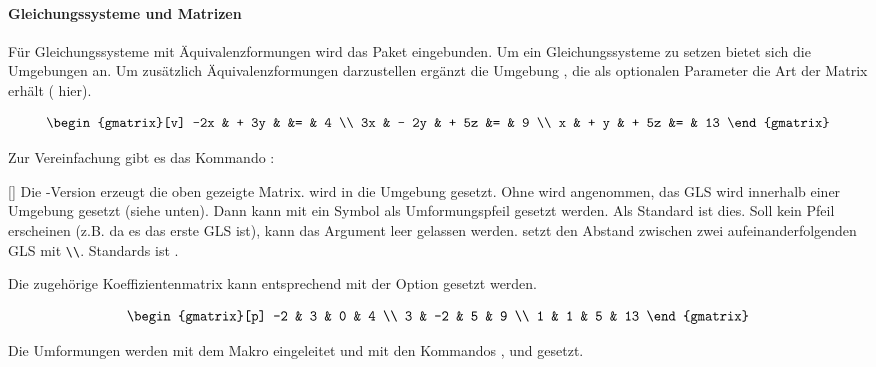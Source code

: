 \paragraph{Gleichungssysteme und Matrizen}

Für Gleichungssysteme mit Äquivalenzformungen wird das Paket  eingebunden. Um ein Gleichungssysteme zu setzen bietet sich die  Umgebungen  an. Um zusätzlich Äquivalenzformungen darzustellen ergänzt  die Umgebung , die als optionalen Parameter die Art der  Matrix erhält ( hier).
\begin{sidebyside}
	\[ \begin{gmatrix}[v]
	-2x & + 3y &      &= &  4 \\
	 3x & - 2y & + 5z &= &  9 \\
	  x & +  y & + 5z &= & 13
	\end{gmatrix} \]
\end{sidebyside}

Zur Vereinfachung gibt es das Kommando :
\begin{commands}
	[\sarg{}]
	Die \sarg-Version erzeugt die oben gezeigte Matrix.  wird in die  Umgebung gesetzt. Ohne \sarg wird angenommen, das GLS wird innerhalb einer \sarg Umgebung gesetzt (siehe unten). Dann kann mit  ein Symbol als Umformungspfeil gesetzt werden. Als Standard ist dies. Soll kein Pfeil erscheinen (z.B. da es das erste GLS ist), kann das Argument leer gelassen werden.  setzt den Abstand zwischen zwei aufeinanderfolgenden GLS mit \verb!\\!. Standards ist \code{.8em}.
\end{commands}

Die zugehörige Koeffizientenmatrix kann entsprechend mit der Option  gesetzt werden.
\begin{sidebyside}
	\[ \begin{gmatrix}[p]
	-2 &  3 & 0 &  4 \\
	 3 & -2 & 5 &  9 \\
	 1 &  1 & 5 & 13
	\end{gmatrix} \]
\end{sidebyside}

Die Umformungen werden mit dem Makro  eingeleitet und mit den Kommandos ,  und  gesetzt.

